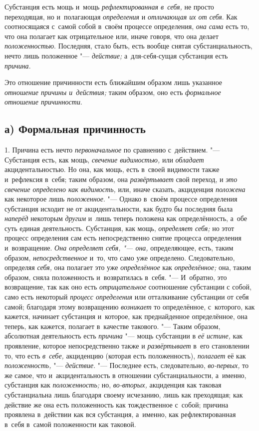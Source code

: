 Субстанция есть мощь и~мощь
{\em рефлектированная в~себя,} не просто переходящая,
но и~полагающая {\em определения} и
{\em отличающая их от себя}. Как соотносящаяся с~самой
собой в~своём процессе определения, {\em она сама} есть
то, что она полагает как отрицательное или, иначе говоря, что она делает
{\em положенностью}. Последняя, стало быть, есть вообще
снятая субстанциальность, нечто лишь положенное
"--- {\em действие;} а~для-себя-сущая субстанция есть {\em причина}.

Это отношение причинности есть ближайшим образом лишь указанное
{\em отношение причины и~действия;} таким образом, оно
есть {\em формальное отношение причинности}.


\subsection[а) Формальная причинность]{а) Формальная причинность}

1. Причина есть нечто {\em первоначальное} по сравнению с~действием. "---
Субстанция есть, как мощь, {\em свечение видимостью,}
или {\em обладает} акцидентальностью. Но она, как мощь,
есть в~своей видимости также и~рефлексия в~себя; таким образом, она
{\em развёртывает} свой переход, и
{\em это свечение определено как видимость,} или, иначе
сказать, акциденция {\em положена} как некоторое лишь
{\em положенное}. "--- Однако в~своём процессе определения
субстанция исходит не от акцидентальности, как будто бы последняя была
{\em наперёд} некоторым {\em другим} и~лишь теперь положена как определённость,
а~обе суть единая деятельность. Субстанция, как мощь,
{\em определяет себя;} но этот процесс определения сам
есть непосредственно снятие процесса определения и~возвращение.
{\em Она определяет себя, "--- она,} определяющее, есть,
таким образом, {\em непосредственное} и~то, что само
уже определено. Следовательно, определяя {\em себя,}
она полагает это уже {\em определённое} как
{\em определённое;} она, таким образом, сняла
положенность и~возвратилась в~себя. "--- И~обратно, это возвращение, так как
оно есть {\em отрицательное} соотношение субстанции с
собой, само есть некоторый {\em процесс определения}
или отталкивание субстанции от себя самой; благодаря этому возвращению
{\em возникает} то определённое, с~которого, как
кажется, начинает субстанция и~которое, как преднайденное определённое, она
теперь, как кажется, полагает в~качестве такового. "--- Таким образом,
абсолютная деятельность есть {\em причина} "--- мощь
субстанции в {\em её истине,} как проявление, которое
непосредственно также и {\em развёртывает} в~его
становлении то, что есть {\em в~себе,} акциденцию
(которая есть положенность), {\em полагает} её как {\em положенность,} "---
{\em действие}. "--- Последнее есть, следовательно,
{\em во-первых,} то же самое, что и~акцидентальность в
отношении субстанциальности, а~именно, субстанция как {\em положенность;}
но, {\em во-вторых,} акциденция как таковая субстанциальна
лишь благодаря своему исчезанию, лишь как преходящая; как действие же она
есть положенность как тождественное с~собой; причина проявлена в~действии
как вся субстанция, а~именно, как рефлектированная в~себя в~самой
положенности как таковой.

